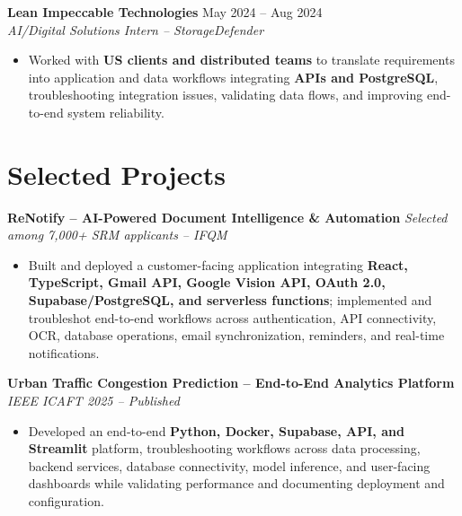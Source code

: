 \documentclass[12pt]{extarticle}
\begin{document}
\textbf{Lean Impeccable Technologies} \hfill May 2024 -- Aug 2024 \\
\textit{AI/Digital Solutions Intern -- StorageDefender}

\begin{itemize}
    \item Worked with \textbf{US clients and distributed teams} to translate
    requirements into application and data workflows integrating
    \textbf{APIs and PostgreSQL}, troubleshooting integration issues,
    validating data flows, and improving end-to-end system reliability.
\end{itemize}


\section*{Selected Projects}

\textbf{ReNotify -- AI-Powered Document Intelligence \& Automation}
\hfill \textit{Selected among 7,000+ SRM applicants -- IFQM}

\begin{itemize}
    \item Built and deployed a customer-facing application integrating
    \textbf{React, TypeScript, Gmail API, Google Vision API, OAuth 2.0,
    Supabase/PostgreSQL, and serverless functions}; implemented and
    troubleshot end-to-end workflows across authentication, API connectivity,
    OCR, database operations, email synchronization, reminders, and
    real-time notifications.
\end{itemize}

\vspace{3pt}

\textbf{Urban Traffic Congestion Prediction -- End-to-End Analytics Platform}
\hfill \textit{IEEE ICAFT 2025 -- Published}

\begin{itemize}
    \item Developed an end-to-end \textbf{Python, Docker, Supabase, API,
    and Streamlit} platform, troubleshooting workflows across data
    processing, backend services, database connectivity, model inference,
    and user-facing dashboards while validating performance and documenting
    deployment and configuration.
\end{itemize}

\vspace{3pt}
\end{document}
